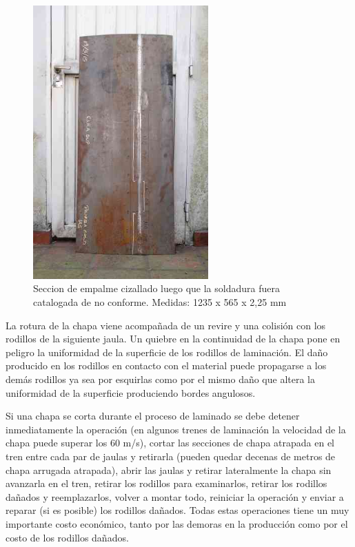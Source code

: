 \begin{figure}[h]
	\centering
	\includegraphics[width=0.60\textwidth]{./Figures/chapaCompletaChica.jpg}
	\caption{Seccion de empalme cizallado luego que la soldadura fuera catalogada de no conforme. Medidas: 1235 x 565 x 2,25 mm}
	\label{fig:chapa_completa_chica} 
\end{figure}

La rotura de la chapa viene acompañada de un revire y una colisión con los rodillos de la siguiente jaula. Un quiebre en la continuidad de la chapa pone en peligro la uniformidad de la superficie de los rodillos de laminación. El daño producido en los rodillos en contacto con el material puede propagarse a los demás rodillos ya sea por esquirlas como por el mismo daño que altera la uniformidad de la superficie produciendo bordes angulosos. 


Si una chapa se corta durante el proceso de laminado se debe detener inmediatamente la operación (en algunos trenes de laminación la velocidad de la chapa puede superar los 60 m/s), cortar las secciones de chapa atrapada en el tren entre cada par de jaulas y retirarla (pueden quedar decenas de metros de chapa arrugada atrapada), abrir las jaulas y retirar lateralmente la chapa sin avanzarla en el tren, retirar los rodillos para examinarlos, retirar los rodillos dañados y reemplazarlos, volver a montar todo, reiniciar la operación y enviar a reparar (si es posible) los rodillos dañados. Todas estas operaciones tiene un muy importante costo económico, tanto por las demoras en la producción como por el costo de los rodillos dañados.



